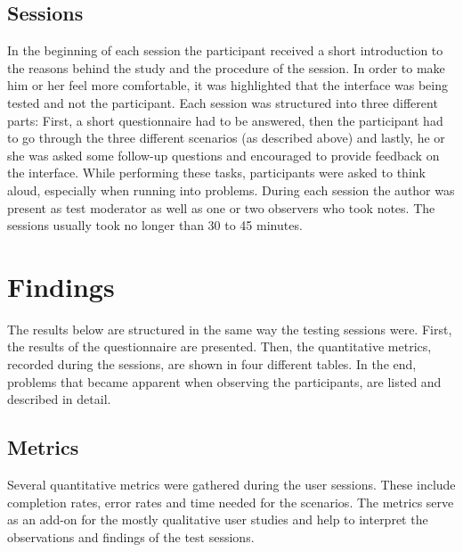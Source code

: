 \subsection{Sessions}
In the beginning of each session the participant received a short introduction to the reasons behind the study and the procedure of the session. In order to make him or her feel more comfortable, it was highlighted that the interface was being tested and not the participant. Each session was structured into three different parts: First, a short questionnaire had to be answered, then the participant had to go through the three different scenarios (as described above) and lastly, he or she was asked some follow-up questions and encouraged to provide feedback on the interface. While performing these tasks, participants were asked to think aloud, especially when running into problems. During each session the author was present as test moderator as well as one or two observers who took notes. The sessions usually took no longer than 30 to 45 minutes.

\section{Findings}
The results below are structured in the same way the testing sessions were. First, the results of the questionnaire are presented. Then, the quantitative metrics, recorded during the sessions, are shown in four different tables. In the end, problems that became apparent when observing the participants, are listed and described in detail.


\subsection{Metrics}
Several quantitative metrics were gathered during the user sessions. These include completion rates, error rates and time needed for the scenarios. The metrics serve as an add-on for the mostly qualitative user studies and help to interpret the observations and findings of the test sessions.

